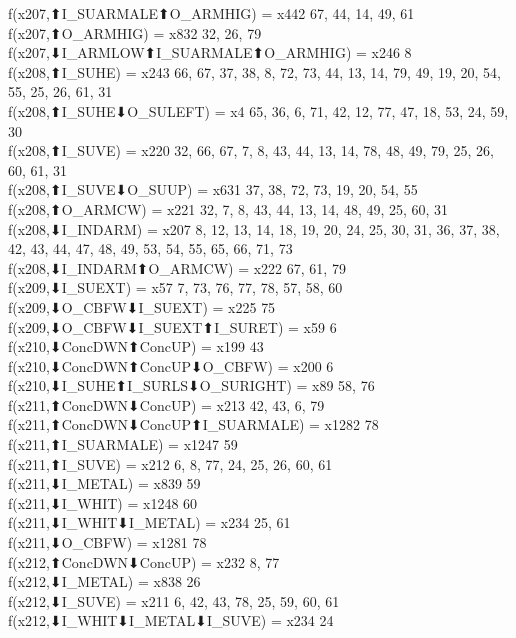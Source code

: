 f(x207,⬆I_SUARMALE⬆O_ARMHIG) = x442 {67, 44, 14, 49, 61} \\
f(x207,⬆O_ARMHIG) = x832 {32, 26, 79} \\
f(x207,⬇I_ARMLOW⬆I_SUARMALE⬆O_ARMHIG) = x246 {8} \\
f(x208,⬆I_SUHE) = x243 {66, 67, 37, 38, 8, 72, 73, 44, 13, 14, 79, 49, 19, 20, 54, 55, 25, 26, 61, 31} \\
f(x208,⬆I_SUHE⬇O_SULEFT) = x4 {65, 36, 6, 71, 42, 12, 77, 47, 18, 53, 24, 59, 30} \\
f(x208,⬆I_SUVE) = x220 {32, 66, 67, 7, 8, 43, 44, 13, 14, 78, 48, 49, 79, 25, 26, 60, 61, 31} \\
f(x208,⬆I_SUVE⬇O_SUUP) = x631 {37, 38, 72, 73, 19, 20, 54, 55} \\
f(x208,⬆O_ARMCW) = x221 {32, 7, 8, 43, 44, 13, 14, 48, 49, 25, 60, 31} \\
f(x208,⬇I_INDARM) = x207 {8, 12, 13, 14, 18, 19, 20, 24, 25, 30, 31, 36, 37, 38, 42, 43, 44, 47, 48, 49, 53, 54, 55, 65, 66, 71, 73} \\
f(x208,⬇I_INDARM⬆O_ARMCW) = x222 {67, 61, 79} \\
f(x209,⬇I_SUEXT) = x57 {7, 73, 76, 77, 78, 57, 58, 60} \\
f(x209,⬇O_CBFW⬇I_SUEXT) = x225 {75} \\
f(x209,⬇O_CBFW⬇I_SUEXT⬆I_SURET) = x59 {6} \\
f(x210,⬇ConcDWN⬆ConcUP) = x199 {43} \\
f(x210,⬇ConcDWN⬆ConcUP⬇O_CBFW) = x200 {6} \\
f(x210,⬇I_SUHE⬆I_SURLS⬇O_SURIGHT) = x89 {58, 76} \\
f(x211,⬆ConcDWN⬇ConcUP) = x213 {42, 43, 6, 79} \\
f(x211,⬆ConcDWN⬇ConcUP⬆I_SUARMALE) = x1282 {78} \\
f(x211,⬆I_SUARMALE) = x1247 {59} \\
f(x211,⬆I_SUVE) = x212 {6, 8, 77, 24, 25, 26, 60, 61} \\
f(x211,⬇I_METAL) = x839 {59} \\
f(x211,⬇I_WHIT) = x1248 {60} \\
f(x211,⬇I_WHIT⬇I_METAL) = x234 {25, 61} \\
f(x211,⬇O_CBFW) = x1281 {78} \\
f(x212,⬆ConcDWN⬇ConcUP) = x232 {8, 77} \\
f(x212,⬇I_METAL) = x838 {26} \\
f(x212,⬇I_SUVE) = x211 {6, 42, 43, 78, 25, 59, 60, 61} \\
f(x212,⬇I_WHIT⬇I_METAL⬇I_SUVE) = x234 {24} \\
